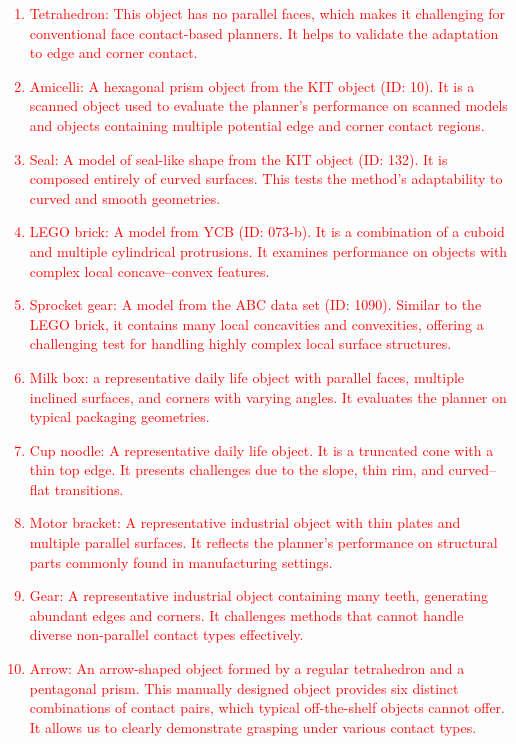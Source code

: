 \documentclass[journal]{IEEEtran}
\newcommand{\rev}[1]{\textcolor{red}{#1}}
\begin{document}
\rev{
\begin{enumerate}
    \item Tetrahedron: This object has no parallel faces, which makes it challenging for conventional face contact-based planners. It helps to validate the adaptation to edge and corner contact.
    \item Amicelli: A hexagonal prism object from the KIT object (ID: 10). It is a scanned object used to evaluate the planner’s performance on scanned models and objects containing multiple potential edge and corner contact regions.
    \item Seal: A model of seal-like shape from the KIT object (ID: 132). It is composed entirely of curved surfaces. This tests the method’s adaptability to curved and smooth geometries.
    \item LEGO brick: A model from YCB (ID: 073-b). It is a combination of a cuboid and multiple cylindrical protrusions. It examines performance on objects with complex local concave–convex features.
    \item Sprocket gear: A model from the ABC data set (ID: 1090). Similar to the LEGO brick, it contains many local concavities and convexities, offering a challenging test for handling highly complex local surface structures.
    \item Milk box: a representative daily life object with parallel faces, multiple inclined surfaces, and corners with varying angles. It evaluates the planner on typical packaging geometries.
    \item Cup noodle: A representative daily life object. It is a truncated cone with a thin top edge. It presents challenges due to the slope, thin rim, and curved–flat transitions.
    \item Motor bracket: A representative industrial object with thin plates and multiple parallel surfaces. It reflects the planner’s performance on structural parts commonly found in manufacturing settings.
    \item Gear: A representative industrial object containing many teeth, generating abundant edges and corners. It challenges methods that cannot handle diverse non-parallel contact types effectively.
    \item Arrow: An arrow-shaped object formed by a regular tetrahedron and a pentagonal prism. This manually designed object provides six distinct combinations of contact pairs, which typical off-the-shelf objects cannot offer. It allows us to clearly demonstrate grasping under various contact types.
\end{enumerate}}
\end{document}
